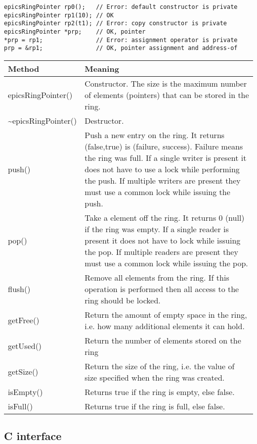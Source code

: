 \begin{verbatim}
epicsRingPointer rp0();   // Error: default constructor is private
epicsRingPointer rp1(10); // OK
epicsRingPointer rp2(t1); // Error: copy constructor is private
epicsRingPointer *prp;    // OK, pointer
*prp = rp1;               // Error: assignment operator is private
prp = &rp1;               // OK, pointer assignment and address-of
\end{verbatim}
\begin{center}
\begin{longtable}{p{1.27778in}p{5.0in}}
\textbf{Method} & \textbf{Meaning}\\
\hline
epicsRingPointer() & Constructor. The size is the maximum number of elements (pointers) that can be stored in the ring.\\
\~{}epicsRingPointer() & Destructor.\\
push() & Push a new entry on the ring. It returns (false,true) is (failure, success). Failure means the ring was full. If a single writer is present it does not have to use a lock while performing the push. If multiple writers are present they must use a common lock while issuing the push. \\
pop() & Take a element off the ring. It returns 0 (null) if the ring was empty. If a single reader is present it does not have to lock while issuing the pop. If multiple readers are present they must use a common lock while issuing the pop.\\
flush() & Remove all elements from the ring. If this operation is performed then all access to the ring should be locked.\\
getFree() & Return the amount of empty space in the ring, i.e. how many additional elements it can hold.\\
getUsed() & Return the number of elements stored on the ring\\
getSize() & Return the size of the ring, i.e. the value of size specified when the ring was created.\\
isEmpty() & Returns true if the ring is empty, else false.\\
isFull() & Returns true if the ring is full, else false.
\end{longtable}

\end{center}


\subsection{C interface}

